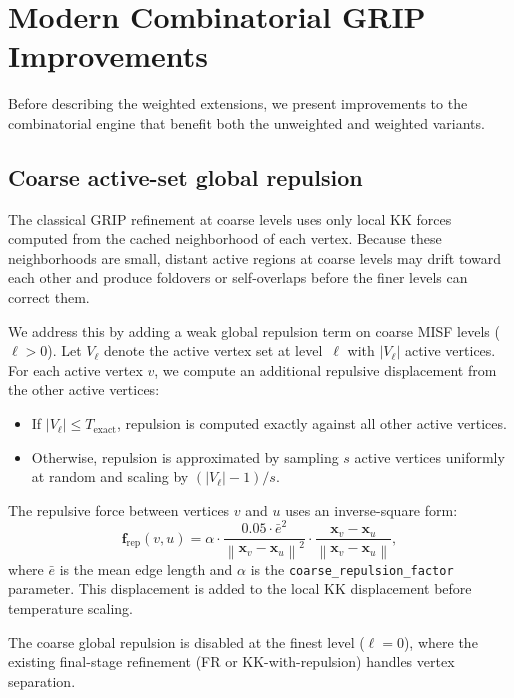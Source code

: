 \documentclass[11pt,twocolumn]{article}
\newcommand{\norm}[1]{\left\lVert #1 \right\rVert}
\newcommand{\vect}[1]{\mathbf{#1}}
\begin{document}
\section{Modern Combinatorial GRIP Improvements}\label{sec:modern}

Before describing the weighted extensions, we present improvements to the
combinatorial engine that benefit both the unweighted and weighted
variants.

\subsection{Coarse active-set global repulsion}\label{sec:globalrep}

The classical GRIP refinement at coarse levels uses only local
KK forces computed from the cached neighborhood of each vertex.  Because
these neighborhoods are small, distant active regions at coarse levels
may drift toward each other and produce foldovers or self-overlaps before
the finer levels can correct them.

We address this by adding a weak global repulsion term on coarse MISF
levels ($\ell > 0$).  Let $V_\ell$ denote the active vertex set at
level~$\ell$ with $|V_\ell|$ active vertices.  For each active vertex
$v$, we compute an additional repulsive displacement from the other
active vertices:

\begin{itemize}
\item If $|V_\ell| \leq T_{\mathrm{exact}}$, repulsion is computed
  exactly against all other active vertices.
\item Otherwise, repulsion is approximated by sampling $s$ active
  vertices uniformly at random and scaling by $(|V_\ell| - 1)/s$.
\end{itemize}

The repulsive force between vertices $v$ and $u$ uses an inverse-square
form:
\[
  \vect{f}_{\mathrm{rep}}(v, u) =
  \alpha \cdot \frac{0.05 \cdot \bar{e}^2}{\norm{\vect{x}_v - \vect{x}_u}^2}
  \cdot \frac{\vect{x}_v - \vect{x}_u}{\norm{\vect{x}_v - \vect{x}_u}},
\]
where $\bar{e}$ is the mean edge length and $\alpha$ is the
\texttt{coarse\_repulsion\_factor} parameter.  This displacement is added
to the local KK displacement before temperature scaling.

The coarse global repulsion is disabled at the finest level ($\ell = 0$),
where the existing final-stage refinement (FR or KK-with-repulsion)
handles vertex separation.
\end{document}
